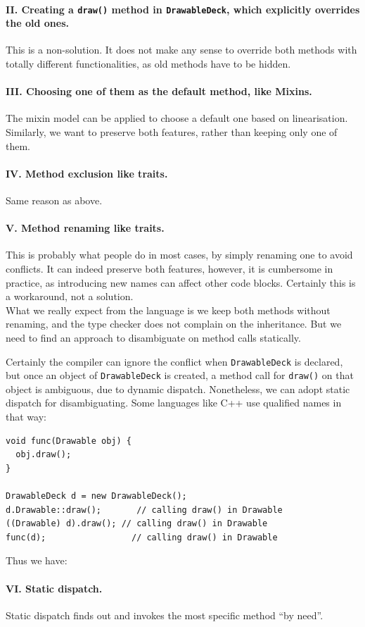 \paragraph{II. Creating a \lstinline|draw()| method in \lstinline|DrawableDeck|, which explicitly overrides the old ones.}
This is a non-solution. It does not make any sense to override both methods with totally different functionalities, as old
methods have to be hidden.

\paragraph{III. Choosing one of them as the default method, like Mixins.} The mixin model can be applied to choose a
default one based on linearisation. Similarly, we want to preserve both features, rather than keeping only one of them.

\paragraph{IV. Method exclusion like traits.} Same reason as above. 

\paragraph{V. Method renaming like traits.} This is probably what people do in most cases,  by simply renaming one to avoid conflicts.
It can indeed preserve both features, however, it is cumbersome in practice, as introducing new names can affect other code blocks.
Certainly this is a workaround, not a solution.\\

What we really expect from the language is we keep both methods without renaming, and the type checker does not complain on the
inheritance. But we need to find an approach to disambiguate on method calls statically.

Certainly the compiler can ignore the conflict when \lstinline|DrawableDeck| is declared, but once an object of \lstinline|DrawableDeck| is created, a method call for \lstinline|draw()| on that object is ambiguous, due to dynamic dispatch. Nonetheless, we can adopt static dispatch for disambiguating. Some languages like C++ use qualified names in that way:

\vspace{3pt}\begin{lstlisting}
void func(Drawable obj) {
  obj.draw();
}

DrawableDeck d = new DrawableDeck();
d.Drawable::draw();       // calling draw() in Drawable
((Drawable) d).draw(); // calling draw() in Drawable
func(d);                 // calling draw() in Drawable
\end{lstlisting}\vspace{3pt}
Thus we have: \paragraph{VI. Static dispatch.} Static dispatch finds out and invokes the most specific method ``by need''.

